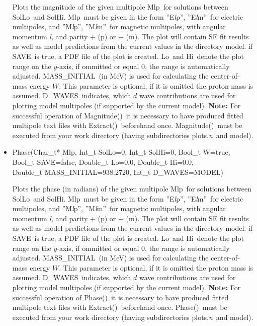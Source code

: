 \documentclass[a4paper,10pt]{article}
\def\tt{\ttfamily}
\def\rm{\rmfamily}
\begin{document}
\begin{itemize}
Plots the magnitude of the given multipole \tt Mlp\rm\ for solutions between \tt SolLo\rm\ and \tt SolHi\rm.
\tt Mlp\rm\ must be given in the form \tt ''E\textit{l}p''\rm,
\tt ''E\textit{l}m''\rm\ 
for electric multipoles, and
\tt ''M\textit{l}p''\rm,
\tt ''M\textit{l}m''\rm\ 
for magnetic multipoles, with angular momentum \tt\textit{l}\rm, and parity
$+$ (\tt p\rm) or $-$ (\tt m\rm). The plot will contain SE fit results as well as model predictions from the current
values in the directory \tt model\rm.
if \tt SAVE\rm\ is true, a PDF file of the plot is created. \tt Lo\rm\ and \tt Hi\rm\ denote the plot range on the $y$-axis, 
if ommitted or equal 0, the range is automatically adjusted.
\tt MASS\_INITIAL\rm\ (in MeV) is used for calculating the center-of-mass energy $W$. This parameter 
is optional, if it is omitted the proton mass is assumed.
\tt D\_WAVES\rm\ indicates, which $d$ wave contributions are used for plotting model multipoles (if supported by the current model).
\textbf{Note:} For successful operation of \tt Magnitude()\rm\ it is necessary to have produced
fitted multipole text files with \tt Extract()\rm\ beforehand once. \tt Magnitude()\rm\ must be executed from your
work directory (having subdirectories \tt plots.\textit{n}\rm\ and \tt model\rm).

\item
\tt Phase(Char\_t* Mlp, Int\_t SolLo=0, Int\_t SolHi=0, Bool\_t W=true,\\
\phantom{Phase(}Bool\_t SAVE=false, Double\_t Lo=0.0, Double\_t Hi=0.0,\\
\phantom{Phase(}Double\_t MASS\_INITIAL=938.2720, Int\_t D\_WAVES=MODEL)\rm

Plots the phase (in radians) of the given multipole \tt Mlp\rm\ for solutions between \tt SolLo\rm\ and \tt SolHi\rm.
\tt Mlp\rm\ must be given in the form \tt ''E\textit{l}p''\rm,
\tt ''E\textit{l}m''\rm\ 
for electric multipoles, and
\tt ''M\textit{l}p''\rm,
\tt ''M\textit{l}m''\rm\ 
for magnetic multipoles, with angular momentum \tt\textit{l}\rm, and parity
$+$ (\tt p\rm) or $-$ (\tt m\rm). The plot will contain SE fit results as well as model predictions from the current
values in the directory \tt model\rm.
if \tt SAVE\rm\ is true, a PDF file of the plot is created. \tt Lo\rm\ and \tt Hi\rm\ denote the plot range on the $y$-axis, 
if ommitted or equal 0, the range is automatically adjusted.
\tt MASS\_INITIAL\rm\ (in MeV) is used for calculating the center-of-mass energy $W$. This parameter 
is optional, if it is omitted the proton mass is assumed.
\tt D\_WAVES\rm\ indicates, which $d$ wave contributions are used for plotting model multipoles (if supported by the current model).
\textbf{Note:} For successful operation of \tt Phase()\rm\ it is necessary to have produced
fitted multipole text files with \tt Extract()\rm\ beforehand once. \tt Phase()\rm\ must be executed from your
work directory (having subdirectories \tt plots.\textit{n}\rm\ and \tt model\rm).


\end{itemize}
\end{document}
